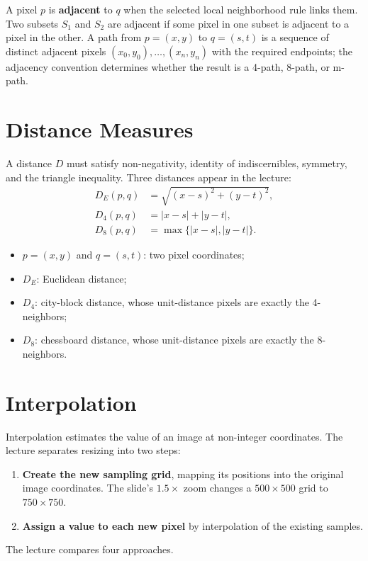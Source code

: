\documentclass[11pt,a4paper,oneside]{report}
\newcommand{\mathlegend}[1]{%
  \par\vspace{0.2em}{\small\itshape where}\par
  \begin{itemize}[leftmargin=1.7em,topsep=0.15em,itemsep=0.12em]
  #1
  \end{itemize}
}
\begin{document}


A pixel $p$ is \textbf{adjacent} to $q$ when the selected local neighborhood rule links them. Two subsets $S_1$ and $S_2$ are adjacent if some pixel in one subset is adjacent to a pixel in the other. A path from $p=(x,y)$ to $q=(s,t)$ is a sequence of distinct adjacent pixels $(x_0,y_0),\ldots,(x_n,y_n)$ with the required endpoints; the adjacency convention determines whether the result is a 4-path, 8-path, or m-path.

\section{Distance Measures}

A distance $D$ must satisfy non-negativity, identity of indiscernibles, symmetry, and the triangle inequality. Three distances appear in the lecture:
\begin{align}
D_E(p,q) &= \sqrt{(x-s)^2+(y-t)^2},\label{eq:euclidean-distance}\\
D_4(p,q) &= |x-s|+|y-t|,\label{eq:cityblock-distance}\\
D_8(p,q) &= \max\{|x-s|,|y-t|\}.\label{eq:chessboard-distance}
\end{align}
\mathlegend{
  \item $p=(x,y)$ and $q=(s,t)$: two pixel coordinates;
  \item $D_E$: Euclidean distance;
  \item $D_4$: city-block distance, whose unit-distance pixels are exactly the 4-neighbors;
  \item $D_8$: chessboard distance, whose unit-distance pixels are exactly the 8-neighbors.
}

\section{Interpolation}

Interpolation estimates the value of an image at non-integer coordinates. The lecture separates resizing into two steps:
\begin{enumerate}
\item \textbf{Create the new sampling grid}, mapping its positions into the original image coordinates. The slide's $1.5\times$ zoom changes a $500\times500$ grid to $750\times750$.
\item \textbf{Assign a value to each new pixel} by interpolation of the existing samples.
\end{enumerate}
The lecture compares four approaches.
\end{document}
